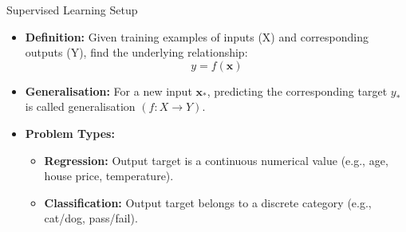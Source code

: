 \documentclass[aspectratio=169, 10pt,handout]{beamer}
\newcommand{\bx}{\mathbf{x}}
\begin{document}

\begin{frame}{Supervised Learning Setup}


  \begin{itemize}
    \item \textbf{Definition:} Given training examples of inputs (X) and
      corresponding outputs (Y), find the underlying relationship:
      \[
        y = f(\bx)
      \]
      
    \item \textbf{Generalisation:} For a new input $\bx_*$, predicting the
      corresponding target $y_*$ is called generalisation $(f:X\to Y)$.
      
    \item \textbf{Problem Types:}
      \begin{itemize}
        \item \textbf{Regression:} Output target is a continuous numerical value
          (e.g., age, house price, temperature).
        \item \textbf{Classification:} Output target belongs to a discrete
          category (e.g., cat/dog, pass/fail).
      \end{itemize}
    
  \end{itemize}

\end{frame}
\end{document}
